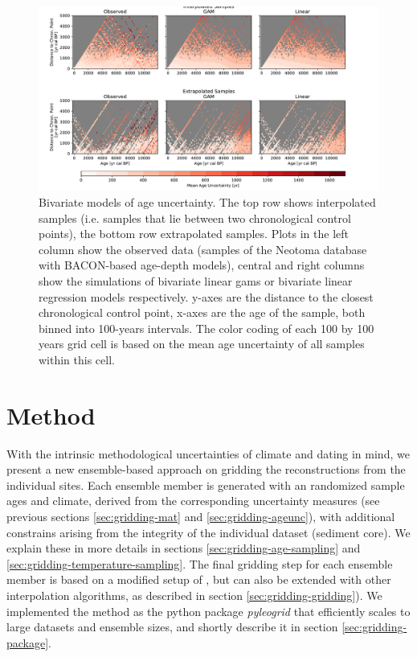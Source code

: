 \begin{refsection}
\begin{figure}
	\includegraphics[width=\linewidth]{gridding-figures/bivariate-models.pdf}
	\caption[Univariate age uncertainty models]{Bivariate models of age uncertainty. The top row shows interpolated samples (i.e. samples that lie between two chronological control points), the bottom row extrapolated samples. Plots in the left column show the observed data (samples of the Neotoma database with BACON-based age-depth models), central and right columns show the simulations of bivariate linear \glspl{gam} or bivariate linear regression models respectively. y-axes are the distance to the closest chronological control point, x-axes are the age of the sample, both binned into 100-years intervals. The color coding of each 100 by 100 years grid cell is based on the mean age uncertainty of all samples within this cell.}
	\label{fig:gridding-bivariate-age-unc}
\end{figure}

\section{Method}  \label{sec:gridding-method}
With the intrinsic methodological uncertainties of climate and dating in mind, we present a new ensemble-based approach on gridding the reconstructions from the individual sites. Each ensemble member is generated with an randomized sample ages and climate, derived from the corresponding uncertainty measures (see previous sections \ref{sec:gridding-mat} and \ref{sec:gridding-ageunc}), with additional constrains arising from the integrity of the individual dataset (sediment core). We explain these in more details in sections \ref{sec:gridding-age-sampling} and \ref{sec:gridding-temperature-sampling}. The final gridding step for each ensemble member is based on a modified setup of \cite{MauriDavisCollinsEtAl2015}, but can also be extended with other interpolation algorithms, as described in section \ref{sec:gridding-gridding}). We implemented the method as the python package \textit{pyleogrid} that efficiently scales to large datasets and ensemble sizes, and shortly describe it in section \ref{sec:gridding-package}.


\end{refsection}
